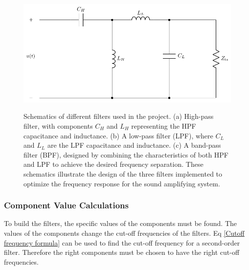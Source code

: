 \begin{figure}[H]
\begin{minipage}{0.29\textwidth}
        \captionsetup{justification=centering}
        \label{fig:LowPassFilter}
    \end{minipage}%
    \hfill
    \begin{minipage}{0.36\textwidth}
        \centering
        \includegraphics[width=\linewidth]{TU Delft Booming Bass Project Report/figures/FilterGroup/Band pass filter schematic.pdf}
        \captionsetup{justification=centering}
        \label{fig:BandPassFilter}
    \end{minipage}
    \captionsetup{justification=raggedright, labelfont=bf}
    \caption{Schematics of different filters used in the project. (a) High-pass filter, with components $C_H$ and $L_H$ representing the HPF capacitance and inductance. (b) A low-pass filter (LPF), where $C_L$ and $L_L$ are the LPF capacitance and inductance. (c) A band-pass filter (BPF), designed by combining the characteristics of both HPF and LPF to achieve the desired frequency separation. These schematics illustrate the design of the three filters implemented to optimize the frequency response for the sound amplifying system.}
    \label{fig:FilterSchematics}
\end{figure}



\subsubsection{Component Value Calculations}
To build the filters, the specific values of the components must be found. The values of the components change the cut-off frequencies of the filters. Eq \ref{Cutoff frequency formula} can be used to find the cut-off frequency for a second-order filter. Therefore the right components must be chosen to have the right cut-off frequencies. 


